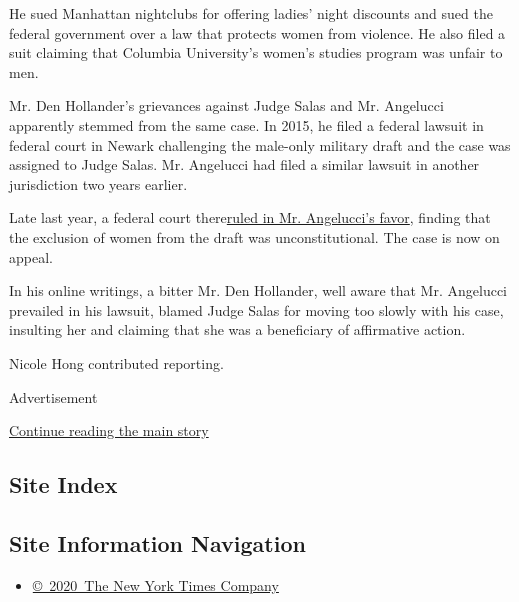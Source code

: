 He sued Manhattan nightclubs for offering ladies' night discounts and
sued the federal government over a law that protects women from
violence. He also filed a suit claiming that Columbia University's
women's studies program was unfair to men.

Mr. Den Hollander's grievances against Judge Salas and Mr. Angelucci
apparently stemmed from the same case. In 2015, he filed a federal
lawsuit in federal court in Newark challenging the male-only military
draft and the case was assigned to Judge Salas. Mr. Angelucci had filed
a similar lawsuit in another jurisdiction two years earlier.

Late last year, a federal court
there\href{https://www.nytimes3xbfgragh.onion/2019/02/24/us/military-draft-men-unconstitutional.html}{ruled
in Mr. Angelucci's favor}, finding that the exclusion of women from the
draft was unconstitutional. The case is now on appeal.

In his online writings, a bitter Mr. Den Hollander, well aware that Mr.
Angelucci prevailed in his lawsuit, blamed Judge Salas for moving too
slowly with his case, insulting her and claiming that she was a
beneficiary of affirmative action.

Nicole Hong contributed reporting.

Advertisement

\protect\hyperlink{after-bottom}{Continue reading the main story}

\hypertarget{site-index}{%
\subsection{Site Index}\label{site-index}}

\hypertarget{site-information-navigation}{%
\subsection{Site Information
Navigation}\label{site-information-navigation}}

\begin{itemize}
\tightlist
\item
  \href{https://help.nytimes3xbfgragh.onion/hc/en-us/articles/115014792127-Copyright-notice}{©~2020~The
  New York Times Company}
\end{itemize}

